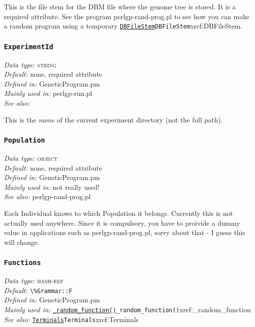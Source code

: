 \documentclass[a4paper]{article}
\begin{document}
This is the file stem for the DBM file where the genome tree is
stored.  It is a required attribute.  See the program
perlgp-rand-prog.pl to see how you can make a random program using
a temporary \hyperref[no]{\texttt{DBFileStem}}{\texttt{DBFileStem}}{xref:DBFileStem}.

\subsubsection{\texttt{ExperimentId}}\label{xref:ExperimentId}
\begin{flushleft}
\textit{Data type:} \textsc{string}\\
\textit{Default:} none, required attribute\\
\textit{Defined in:} GeneticProgram.pm\\
\textit{Mainly used in:} perlgp-run.pl\\
\textit{See also:}
\end{flushleft}

This is the \textit{name} of the current experiment directory (not the
full path).

\subsubsection{\texttt{Population}}\label{Individual::Population}
\begin{flushleft}
\textit{Data type:} \textsc{object}\\
\textit{Default:} none, required attribute\\
\textit{Defined in:} GeneticProgram.pm\\
\textit{Mainly used in:} not really used!\\
\textit{See also:} perlgp-rand-prog.pl
\end{flushleft}

Each Individual knows to which Population it belongs.  Currently this
is not actually used anywhere.  Since it is compulsory, you have to
proivide a dummy value in applications such as perlgp-rand-prog.pl,
sorry about that - I guess this will change.


\subsubsection{\texttt{Functions}}\label{xref:Functions}
\begin{flushleft}
\textit{Data type:} \textsc{hash-ref}\\
\textit{Default:} \verb;\%Grammar::F;\\
\textit{Defined in:} GeneticProgram.pm\\
\textit{Mainly used in:} \hyperref[no]{\texttt{\_random\_function()}}{\texttt{\_random\_function()}}{xref:_random_function}\\
\textit{See also:} \hyperref[no]{\texttt{Terminals}}{\texttt{Terminals}}{xref:Terminals}
\end{flushleft}
\end{document}
